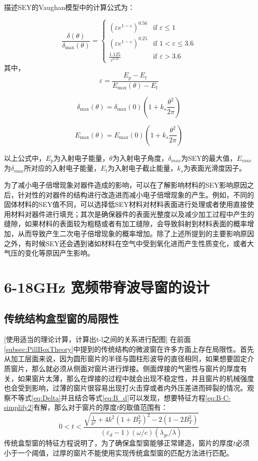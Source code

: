 \documentclass[master]{thesis-uestc}
\begin{document}
描述SEY的Vaughan模型中的计算公式为：

\begin{equation}\label{eq:SEY_Vaughan}
    \frac{\delta(\theta)}{\delta_{\max}(\theta)} = 
    \begin{cases} 
    \left( \varepsilon e^{1 - \varepsilon} \right)^{0.56} & \text{if } \varepsilon \leq 1 \\
    \left( \varepsilon e^{1 - \varepsilon} \right)^{0.25} & \text{if } 1 < \varepsilon \leq 3.6 \\
    \frac{1.125}{\varepsilon^{0.35}} & \text{if } \varepsilon > 3.6
    \end{cases}
\end{equation}
其中，
$$
\varepsilon = \frac{E_p - E_t}{E_{\max}(\theta) - E_t}
$$

$$
\delta_{\max}(\theta) = \delta_{\max}(0) \left( 1 + k_s \frac{\theta^2}{2\pi} \right)
$$

$$
E_{\max}(\theta) = E_{\max}(0) \left( 1 + k_s \frac{\theta^2}{2\pi} \right)
$$

以上公式中，$E_p$为入射电子能量，$\theta$为入射电子角度，$\delta_{max}$为SEY的最大值，$E_{max}$为$\delta_{max}$所对应的入射电子能量，$E_t$为入射电子截止能量，$k_s$为表面光滑度因子。

为了减小电子倍增现象对器件造成的影响，可以在了解影响材料的SEY影响原因之后，针对性的对器件的结构进行改造进而减小电子倍增现象的产生。例如，不同的固体材料的SEY值不同，可以选择低SEY材料对材料表面进行处理或者使用直接使用材料对器件进行填充；其次是确保器件的表面光整度以及减少加工过程中产生的缝隙，如果材料的表面较为粗糙或者有加工缝隙，会导致斜射到材料表面的概率增加，从而导致产生二次电子倍增现象的概率增加。除了上述所提到的主要影响原因之外，有时候SEY还会遇到诸如材料在空气中受到氧化进而产生性质变化，或者大气压的变化等原因产生影响。


\chapter{6-18GHz 宽频带脊波导窗的设计}
\section{传统结构盒型窗的局限性}
[使用适当的理论计算，计算出t-l之间的关系进行配图]
在前面\ref{subsec:PillBoxTheory}中提到的传统结构的微波窗在许多方面上存在局限性。首先从加工层面来说，因为圆形窗片的半径与圆柱形波导的直径相同，如果想要固定介质窗片，那么就必须从侧面对窗片进行焊接。侧面焊接的气密性与窗片的厚度有关，如果窗片太薄，那么在焊接的过程中就会出现不稳定性，并且窗片的机械强度也会受到影响，过薄的窗片很容易出现打火击穿或者内外压差进而碎裂的情况。观察不等式\ref{eq:Delta}并且结合等式\ref{eq:B_d}可以发现，想要特征方程\ref{eq:B-C-simplify2}有解，那么对于窗片的厚度$t$的取值范围有：
\begin{equation}\label{eq:t_constraints}
    0 < t < \frac{\sqrt{\frac{1}{k^2}+4k^2(1+B_{T}^2)^2-2(1-2B_{T}^2)}}{(\varepsilon_{d}-1)(\omega / c)(\lambda_{gc} / \lambda)}
\end{equation}
传统盒型窗的特征方程说明了，为了确保盒型窗能够正常建造，窗片的厚度$t$必须小于一个阈值，过厚的窗片不能使用实现传统盒型窗的匹配方法进行匹配。
\end{document}
